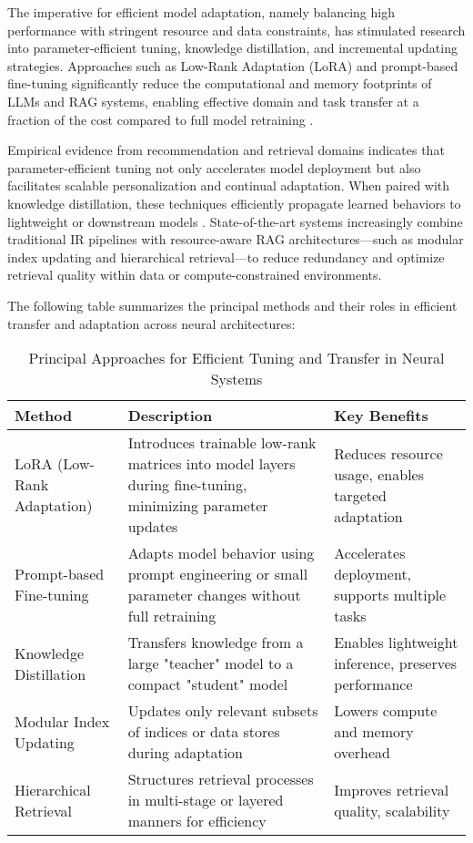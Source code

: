 \documentclass[11pt]{article}
\begin{document}
The imperative for efficient model adaptation, namely balancing high performance with stringent resource and data constraints, has stimulated research into parameter-efficient tuning, knowledge distillation, and incremental updating strategies. Approaches such as Low-Rank Adaptation (LoRA) and prompt-based fine-tuning significantly reduce the computational and memory footprints of LLMs and RAG systems, enabling effective domain and task transfer at a fraction of the cost compared to full model retraining \cite{ref32,ref33,ref55,ref61}.

Empirical evidence from recommendation and retrieval domains indicates that parameter-efficient tuning not only accelerates model deployment but also facilitates scalable personalization and continual adaptation. When paired with knowledge distillation, these techniques efficiently propagate learned behaviors to lightweight or downstream models \cite{ref55}. State-of-the-art systems increasingly combine traditional IR pipelines with resource-aware RAG architectures—such as modular index updating and hierarchical retrieval—to reduce redundancy and optimize retrieval quality within data or compute-constrained environments.

The following table summarizes the principal methods and their roles in efficient transfer and adaptation across neural architectures:

\begin{table}[ht]
\centering
\caption{Principal Approaches for Efficient Tuning and Transfer in Neural Systems}
\label{tab:efficient_transfer}
\begin{tabular}{|l|p{6cm}|l|}
\hline
\textbf{Method} & \textbf{Description} & \textbf{Key Benefits} \\
\hline
LoRA (Low-Rank Adaptation) & Introduces trainable low-rank matrices into model layers during fine-tuning, minimizing parameter updates & Reduces resource usage, enables targeted adaptation \\
\hline
Prompt-based Fine-tuning & Adapts model behavior using prompt engineering or small parameter changes without full retraining & Accelerates deployment, supports multiple tasks \\
\hline
Knowledge Distillation & Transfers knowledge from a large "teacher" model to a compact "student" model & Enables lightweight inference, preserves performance \\
\hline
Modular Index Updating & Updates only relevant subsets of indices or data stores during adaptation & Lowers compute and memory overhead \\
\hline
Hierarchical Retrieval & Structures retrieval processes in multi-stage or layered manners for efficiency & Improves retrieval quality, scalability \\
\hline
\end{tabular}
\end{table}
\end{document}
